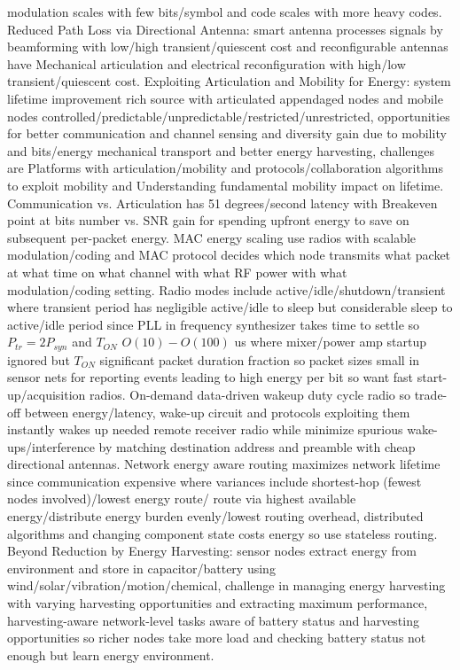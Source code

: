 \documentclass[9pt]{extarticle}
\begin{document}
\begin{multicols}{2}
modulation scales with few bits/symbol and code scales with more heavy codes. Reduced Path Loss via Directional Antenna: smart antenna processes signals by beamforming with low/high transient/quiescent cost and reconfigurable antennas have Mechanical articulation and electrical reconfiguration with high/low transient/quiescent cost. Exploiting Articulation and Mobility for Energy: system lifetime improvement rich source with articulated appendaged nodes and mobile nodes controlled/predictable/unpredictable/restricted/unrestricted, opportunities for better communication and channel sensing and diversity gain due to mobility and bits/energy mechanical transport and better energy harvesting, challenges are  Platforms with articulation/mobility and protocols/collaboration algorithms to exploit mobility and Understanding fundamental mobility impact on lifetime. Communication vs. Articulation has 51 degrees/second latency with Breakeven point at bits number vs. SNR gain for spending upfront energy to save on subsequent per-packet energy. MAC energy scaling use radios with scalable modulation/coding and MAC protocol decides which node transmits what packet at what time on what channel with what RF power with what modulation/coding setting. Radio modes include active/idle/shutdown/transient where transient period has negligible active/idle to sleep but considerable sleep to active/idle period since PLL in frequency synthesizer takes time to settle so $P_{tr} = 2P_{syn}$ and $T_{ON}$ $O(10)-O(100)$ us where mixer/power amp startup ignored but $T_{ON}$  significant packet duration fraction so packet sizes small in sensor nets for reporting events leading to high energy per bit so want fast start-up/acquisition radios. On-demand data-driven wakeup duty cycle radio so trade-off between energy/latency, wake-up circuit and protocols exploiting them instantly wakes up needed remote receiver radio while minimize spurious wake-ups/interference by matching destination address and preamble with cheap directional antennas. Network energy aware routing maximizes network lifetime since communication expensive where variances include shortest-hop (fewest nodes involved)/lowest energy route/ route via highest available energy/distribute energy burden evenly/lowest routing overhead, distributed algorithms and changing component state costs energy so use stateless routing. Beyond Reduction by Energy Harvesting: sensor nodes extract energy from environment and store in capacitor/battery using wind/solar/vibration/motion/chemical, challenge in managing energy harvesting with varying harvesting opportunities and extracting maximum performance, harvesting-aware network-level tasks aware of battery status and harvesting opportunities so richer nodes take more load and checking battery status not enough but learn energy environment.


\end{multicols}
\end{document}

